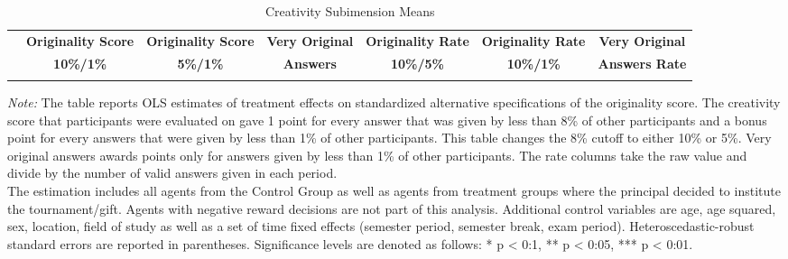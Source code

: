 \begin{landscape}
\begin{table}[h]%
\setlength\tabcolsep{2pt}\caption{Creativity Subimension Means}
\begin{center}%
{\small\renewcommand{\arraystretch}{.9}%
\begin{tabular}{lcccccc}
\hline\hline\noalign{\smallskip}
 & \bf Originality Score & \bf Originality Score & \bf Very Original & \bf Originality Rate & \bf Originality Rate & \bf Very Original\\
 & \bf 10\%/1\%          & \bf 5\%/1\% & \bf Answers & \bf 10\%/5\% & \bf 10\%/1\% & \bf Answers Rate \\
\hline
\noalign{\smallskip}

\hline\hline\noalign{\medskip}
\end{tabular}}
\begin{minipage}{\textwidth}
\footnotesize {\it Note:} The table reports OLS estimates of treatment effects on standardized alternative specifications of the originality score. 
The creativity score that participants were evaluated on gave 1 point for every answer that was given by less than 8\% of other participants and a bonus point for every answers that were given by less than 1\% of other participants. This table changes the 8\% cutoff to either 10\% or 5\%. Very original answers awards points only for answers given by less than 1\% of other participants.
The rate columns take the raw value and divide by the number of valid answers given in each period. \\
The estimation includes all agents from the Control Group as well as agents from treatment groups where the principal decided to institute the tournament/gift. Agents with negative reward decisions are not part of this analysis. Additional control variables are age, age squared, sex, location, field of study as well as a set of time fixed effects (semester period, semester break, exam period). Heteroscedastic-robust standard errors are reported in parentheses. Significance levels are denoted as follows: * p < 0:1, ** p < 0:05, *** p < 0:01. \end{minipage}
\end{center}
\end{table}
\end{landscape}
